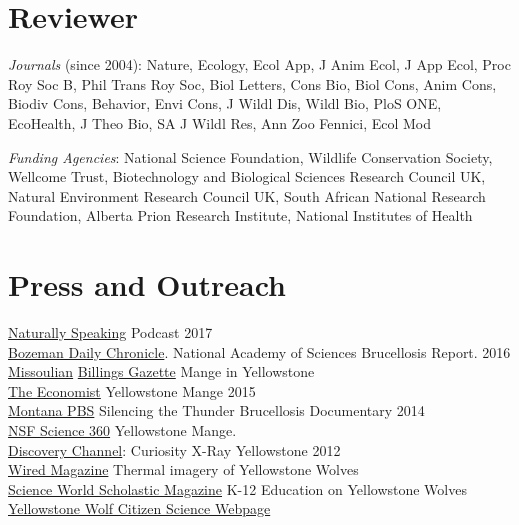 \documentclass[12pt,]{article}
\begin{document}
\hypertarget{reviewer}{%
\section{Reviewer}\label{reviewer}}

\emph{Journals} (since 2004): Nature, Ecology, Ecol App, J Anim Ecol, J
App Ecol, Proc Roy Soc B, Phil Trans Roy Soc, Biol Letters, Cons Bio,
Biol Cons, Anim Cons, Biodiv Cons, Behavior, Envi Cons, J Wildl Dis,
Wildl Bio, PloS ONE, EcoHealth, J Theo Bio, SA J Wildl Res, Ann Zoo
Fennici, Ecol Mod

\emph{Funding Agencies}: National Science Foundation, Wildlife
Conservation Society, Wellcome Trust, Biotechnology and Biological
Sciences Research Council UK, Natural Environment Research Council UK,
South African National Research Foundation, Alberta Prion Research
Institute, National Institutes of Health

\hypertarget{press-and-outreach}{%
\section{Press and Outreach}\label{press-and-outreach}}

\href{https://naturallyspeaking.blog/2017/04/26/episode-51-natures-greatest-theatre-ecology-and-disease-in-yellowstone/}{Naturally
Speaking} Podcast \hfill 2017\\
\href{http://www.bozemandailychronicle.com/news/environment/report-elk-greater-brucellosis-transmission-risk-than-bison/article_8329c551-18a2-50a5-9352-f585935a7d99.html}{Bozeman
Daily Chronicle}. National Academy of Sciences Brucellosis Report.
\hfill 2016\\
\href{https://missoulian.com/news/state-and-regional/disease-s-spread-blamed-on-elk-not-bison-or-feed/article_379e198f-190b-562a-bd6d-950fbed46f71.html}{Missoulian}
\href{https://billingsgazette.com/lifestyles/recreation/mange-changes-yellowstone-wolves-hunting-travel-and-food-needs/article_f876b43f-3e46-5d78-b6e5-ed5e8ddddbdb.html}{Billings
Gazette} Mange in Yellowstone\\
\href{http://www.economist.com/news/science-and-technology/21652259-wolves-yellowstone-provide-some-surprising-survival-lessons-pack-power}{The
Economist} Yellowstone Mange \hfill 2015\\
\href{https://vimeo.com/104296498}{Montana PBS} Silencing the Thunder
Brucellosis Documentary \hfill 2014\\
\href{https://science360.gov/obj/video/0f50aca7-2691-4126-996f-8ec5b74a9eb0/understanding-ecological-role-wolves-yellowstone-national-park}{NSF
Science 360} Yellowstone Mange.\\
\href{http://store.discoveryeducation.com/product/show/129481}{Discovery
Channel}: Curiosity X-Ray Yellowstone \hfill 2012\\
\href{https://www.wired.com/2012/05/st_photo_wolves/}{Wired Magazine}
Thermal imagery of Yellowstone Wolves\\
\href{http://scienceworld.scholastic.com/issues/09_17_12}{Science World
Scholastic Magazine} K-12 Education on Yellowstone Wolves\\
\href{http://www.yellowstonewolf.org}{Yellowstone Wolf Citizen Science
Webpage}
\end{document}
